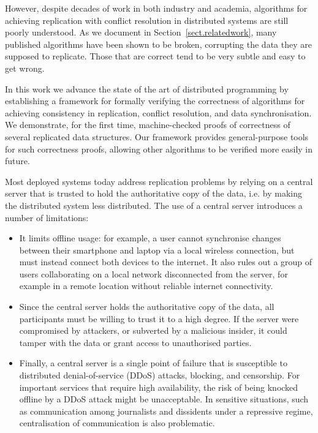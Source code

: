 \documentclass[acmlarge,review,anonymous]{acmart}\settopmatter{printfolios=true}
\begin{document}
However, despite decades of work in both industry and academia, algorithms for achieving replication
with conflict resolution in distributed systems are still poorly understood. As we document in
Section~\ref{sect.relatedwork}, many published algorithms have been shown to be broken, corrupting
the data they are supposed to replicate. Those that are correct tend to be very subtle and easy to
get wrong.

In this work we advance the state of the art of distributed programming by establishing a framework
for formally verifying the correctness of algorithms for achieving consistency in replication,
conflict resolution, and data synchronisation. We demonstrate, for the first time, machine-checked
proofs of correctness of several replicated data structures. Our framework provides general-purpose
tools for such correctness proofs, allowing other algorithms to be verified more easily in future.


Most deployed systems today address replication problems by relying on a central server that is
trusted to hold the authoritative copy of the data, i.e. by making the distributed system less
distributed. The use of a central server introduces a number of limitations:
\begin{itemize}
\item It limits offline usage: for example, a user cannot synchronise changes between their
    smartphone and laptop via a local wireless connection, but must instead connect both devices to
    the internet. It also rules out a group of users collaborating on a local network disconnected
    from the server, for example in a remote location without reliable internet connectivity.
\item Since the central server holds the authoritative copy of the data, all participants must be
    willing to trust it to a high degree. If the server were compromised by attackers, or subverted
    by a malicious insider, it could tamper with the data or grant access to unauthorised parties.
\item Finally, a central server is a single point of failure that is susceptible to distributed
    denial-of-service (DDoS) attacks, blocking, and censorship. For important services that require
    high availability, the risk of being knocked offline by a DDoS attack might be unacceptable. In
    sensitive situations, such as communication among journalists and dissidents under a repressive
    regime, centralisation of communication is also problematic.
\end{itemize}
\end{document}
